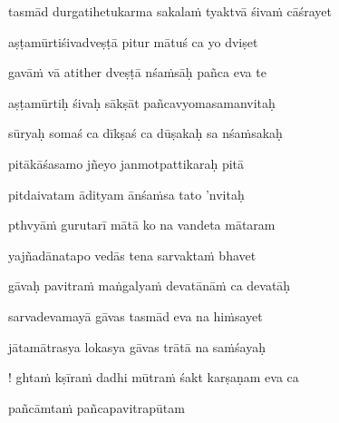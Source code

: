 \nemslokad 
tasmād durgatihetukarma sakala\.m tyaktvā śiva\.m cāśrayet \veg\dontdisplaylinenum


\vers

aṣṭamūrtiśivadveṣṭā pitur mātuś ca yo dviṣet\thinspace{\dandab} \dontdisplaylinenum

gavā\.m vā atither dveṣṭā nśa\.msāḥ pañca eva te \veg\dontdisplaylinenum

aṣṭamūrtiḥ śivaḥ sākṣāt pañcavyomasamanvitaḥ\thinspace{\dandab} \dontdisplaylinenum

sūryaḥ somaś ca dīkṣaś ca dūṣakaḥ sa nśa\.msakaḥ \veg\dontdisplaylinenum

pitākāśasamo jñeyo janmotpattikaraḥ pitā\thinspace{\dandab} \dontdisplaylinenum

pitdaivatam ādityam ānśa\.msa tato 'nvitaḥ \veg\dontdisplaylinenum

pthvyā\.m gurutarī mātā ko na vandeta mātaram\thinspace{\dandab} \dontdisplaylinenum

yajñadānatapo vedās tena sarvakta\.m bhavet \veg\dontdisplaylinenum

gāvaḥ pavitra\.m maṅgalya\.m devatānā\.m ca devatāḥ\thinspace{\dandab} \dontdisplaylinenum

sarvadevamayā gāvas tasmād eva na hi\.msayet \veg\dontdisplaylinenum

jātamātrasya lokasya gāvas trātā na sa\.mśayaḥ\thinspace{\dandab} \dontdisplaylinenum

! ghta\.m kṣīra\.m dadhi mūtra\.m śakt karṣaṇam eva ca \veg\dontdisplaylinenum

\ujvers\nemsloka 
pañcāmta\.m pañcapavitrapūtam
\dontdisplaylinenum

